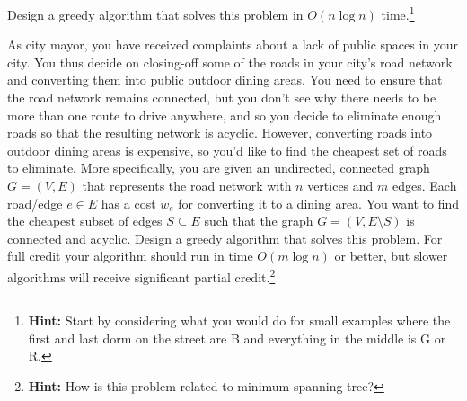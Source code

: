 \documentclass[11pt]{article}
\theoremstyle{definition}
\begin{document}
\begin{enumerate}[leftmargin=0pt, itemsep=3ex]
Design a greedy algorithm that solves this problem in $O(n\log n)$ time.\footnote{\textbf{Hint:} Start by considering what you would do for small examples where the first and last dorm on the street are B and everything in the middle is G or R.}

\problemitem As city mayor, you have received complaints about a lack of public spaces in your city. You thus decide on closing-off some of the roads in your city's road network and converting them into public outdoor dining areas. You need to ensure that the road network remains connected, but you don't see why there needs to be more than one route to drive anywhere, and so you decide to eliminate enough roads so that the resulting network is acyclic.  However, converting roads into outdoor dining areas is expensive, so you'd like to find the cheapest set of roads to eliminate.  More specifically, you are given an undirected, connected graph $G = (V,E)$ that represents the road network with $n$ vertices and $m$ edges.  Each road/edge $e \in E$ has a cost $w_e$ for converting it to a dining area. You want to find the cheapest subset of edges $S \subseteq E$ such that the graph $G = (V, E \setminus S)$ is connected and acyclic. Design a greedy algorithm that solves this problem.  For full credit your algorithm should run in time $O(m \log n)$ or better, but slower algorithms will receive significant partial credit.\footnote{\textbf{Hint:} How is this problem related to minimum spanning tree?}
   
\end{enumerate}
\end{document}
